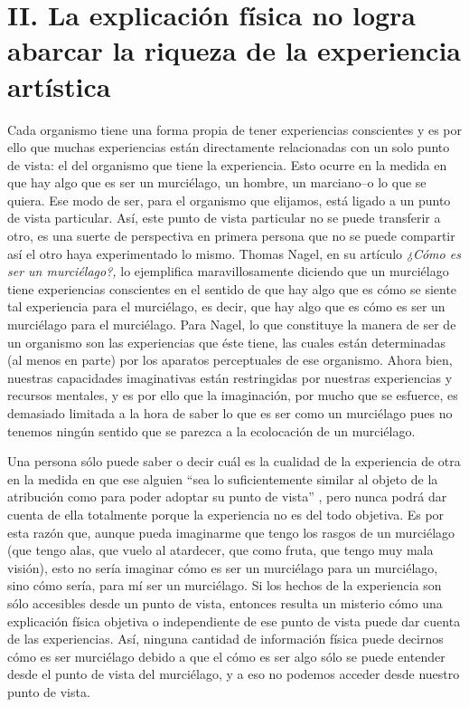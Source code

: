 \documentclass[]{book}
\begin{document}
\section*{II. La explicación física no logra abarcar la riqueza de la
  experiencia artística}


Cada organismo tiene una forma propia de tener experiencias conscientes
y es por ello que muchas experiencias están directamente relacionadas
con un solo punto de vista: el del organismo que tiene la experiencia.
Esto ocurre en la medida en que hay algo que es ser un murciélago, un
hombre, un marciano--o lo que se quiera. Ese modo de ser, para el
organismo que elijamos, está ligado a un punto de vista particular. Así,
este punto de vista particular no se puede transferir a otro, es una
suerte de perspectiva en primera persona que no se puede compartir así
el otro haya experimentado lo mismo. Thomas Nagel, en su artículo
\emph{¿Cómo es ser un murciélago?,} lo ejemplifica maravillosamente
diciendo que un murciélago tiene experiencias conscientes en el sentido
de que hay algo que es cómo se siente tal experiencia para el
murciélago, es decir, que hay algo que es cómo es ser un murciélago para
el murciélago. Para Nagel, lo que constituye la manera de ser de un
organismo son las experiencias que éste tiene, las cuales están
determinadas (al menos en parte) por los aparatos perceptuales de ese
organismo. Ahora bien, nuestras capacidades imaginativas están
restringidas por nuestras experiencias y recursos mentales, y es por
ello que la imaginación, por mucho que se esfuerce, es demasiado
limitada a la hora de saber lo que es ser como un murciélago pues no
tenemos ningún sentido que se parezca a la ecolocación de un murciélago.

Una persona sólo puede saber o decir cuál es la cualidad de la
experiencia de otra en la medida en que ese alguien ``sea lo
suficientemente similar al objeto de la atribución como para poder
adoptar su punto de vista'' , pero nunca podrá dar cuenta de ella
totalmente porque la experiencia no es del todo objetiva. Es por esta
razón que, aunque pueda imaginarme que tengo los rasgos de un murciélago
(que tengo alas, que vuelo al atardecer, que como fruta, que tengo muy
mala visión), esto no sería imaginar cómo es ser un murciélago para un
murciélago, sino cómo sería, para mí ser un murciélago. Si los hechos de
la experiencia son sólo accesibles desde un punto de vista, entonces
resulta un misterio cómo una explicación física objetiva o independiente
de ese punto de vista puede dar cuenta de las experiencias. Así, ninguna
cantidad de información física puede decirnos cómo es ser murciélago
debido a que el cómo es ser algo sólo se puede entender desde el punto
de vista del murciélago, y a eso no podemos acceder desde nuestro punto
de vista.
\end{document}
